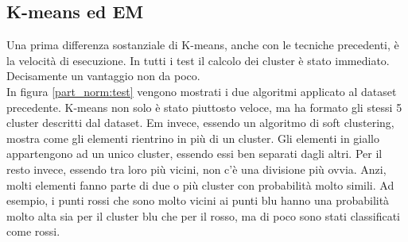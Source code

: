 \documentclass{llncs}
\newcommand{\acapo}{\vspace{0.5\baselineskip}\\}
\begin{document}
	\subsection{K-means ed EM}
	Una prima differenza sostanziale di K-means, anche con le tecniche precedenti, è la velocità di esecuzione. In tutti i test il calcolo dei cluster è stato immediato.
	Decisamente un vantaggio non da poco. 
	\acapo
	In figura \ref{part_norm:test} vengono mostrati i due algoritmi applicato al dataset precedente. K-means non solo è stato piuttosto veloce, ma ha formato gli stessi 5 cluster descritti dal dataset.
	Em invece, essendo un algoritmo di soft clustering, mostra come gli elementi rientrino in più di un cluster. Gli elementi in giallo appartengono ad un unico cluster, essendo essi ben separati dagli altri. 
	Per il resto invece, essendo tra loro più vicini, non c'è una divisione più ovvia. Anzi, molti elementi fanno parte di due o più cluster con probabilità molto simili. 
	Ad esempio, i punti rossi che sono molto vicini ai punti blu hanno una probabilità molto alta sia per il cluster blu che per il rosso, ma di poco sono stati classificati come rossi.
\end{document}
